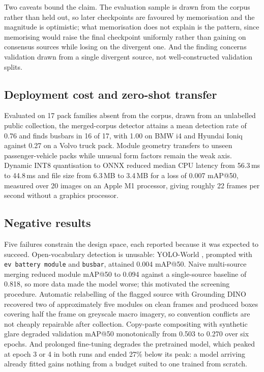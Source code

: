 \documentclass[conference]{IEEEtran}
\begin{document}
Two caveats bound the claim. The evaluation sample is drawn from the corpus rather
than held out, so later checkpoints are favoured by memorisation and the magnitude is
optimistic; what memorisation does not explain is the pattern, since memorising would
raise the final checkpoint uniformly rather than gaining on consensus sources while
losing on the divergent one. And the finding concerns validation drawn from a single
divergent source, not well-constructed validation splits.

\subsection{Deployment cost and zero-shot transfer}
Evaluated on 17 pack families absent from the corpus, drawn from an unlabelled public
collection, the merged-corpus detector attains a mean detection rate of 0.76 and finds
busbars in 16 of 17, with 1.00 on BMW i4 and Hyundai Ioniq against 0.27 on a Volvo
truck pack. Module geometry transfers to unseen passenger-vehicle packs while unusual
form factors remain the weak axis. Dynamic INT8 quantisation to ONNX reduced median
CPU latency from 56.3\,ms to 44.8\,ms and file size from 6.3\,MB to 3.4\,MB for a loss
of 0.007 mAP@50, measured over 20 images on an Apple M1 processor, giving roughly 22
frames per second without a graphics processor.

\subsection{Negative results}
\label{sec:negative}
Five failures constrain the design space, each reported because it was expected to
succeed. Open-vocabulary detection is unusable: YOLO-World \cite{yoloworld}, prompted
with \texttt{ev battery module} and \texttt{busbar}, attained 0.004 mAP@50. Naive
multi-source merging reduced module mAP@50 to 0.094 against a single-source baseline
of 0.818, so more data made the model worse; this motivated the screening procedure.
Automatic relabelling of the flagged source with Grounding DINO \cite{groundingdino}
recovered two of approximately five modules on clean frames and produced boxes
covering half the frame on greyscale macro imagery, so convention conflicts are not
cheaply repairable after collection. Copy-paste compositing
\cite{ghiasi2021copypaste} with synthetic glare degraded validation mAP@50
monotonically from 0.503 to 0.270 over six epochs. And prolonged fine-tuning degrades
the pretrained model, which peaked at epoch 3 or 4 in both runs and ended 27\% below
its peak: a model arriving already fitted gains nothing from a budget suited to one
trained from scratch.
\end{document}
